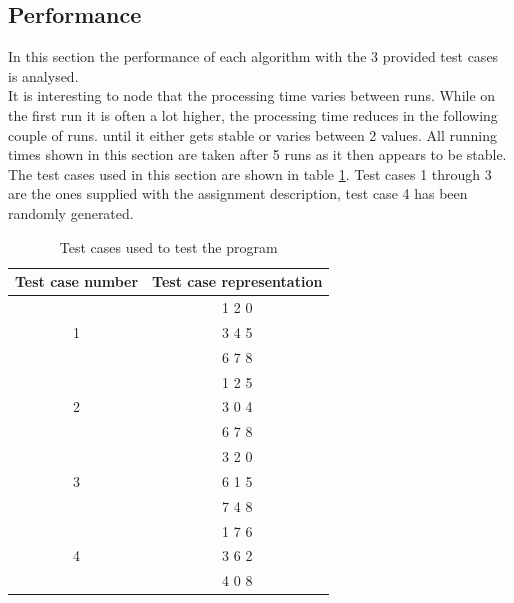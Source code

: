 \documentclass[journal]{IEEEtran}
\begin{document}
\subsection{Performance}
In this section the performance of each algorithm with the 3 provided test cases is analysed. \\
It is interesting to node that the processing time varies between runs. While on the first run it is often a lot higher, the processing time reduces in the following couple of runs. until it either gets stable or varies between 2 values. All running times shown in this section are taken after 5 runs as it then appears to be stable. \\

The test cases used in this section are shown in table \ref{tab:testCases}. 
Test cases 1 through 3 are the ones supplied with the assignment description, test case 4 has been randomly generated.

\begin{table}[h]
\renewcommand{\arraystretch}{1.3}
\centering
\caption{Test cases used to test the program}
\begin{tabular}{|c|c|}
\hline
\bfseries Test case number & \bfseries Test case representation \\\hline
   & 1 2 0 \\
 1 & 3 4 5 \\
   & 6 7 8 \\\hline
   & 1 2 5 \\
 2 & 3 0 4 \\
   & 6 7 8 \\\hline
   & 3 2 0 \\
 3 & 6 1 5 \\
   & 7 4 8 \\\hline
   & 1 7 6 \\
 4 & 3 6 2 \\
   & 4 0 8 \\\hline   
\end{tabular}
\label{tab:testCases}
\end{table}
\end{document}

